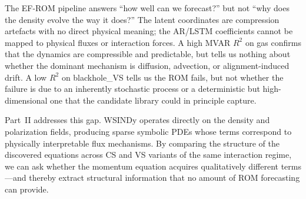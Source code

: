 The EF-ROM pipeline answers ``how well can we forecast?'' but not ``why
does the density evolve the way it does?''  The latent coordinates are
compression artefacts with no direct physical meaning; the AR/LSTM
coefficients cannot be mapped to physical fluxes or interaction forces.
A high MVAR $R^2$ on gas confirms that the dynamics are compressible and
predictable, but tells us nothing about whether the dominant mechanism is
diffusion, advection, or alignment-induced drift.
A low $R^2$ on blackhole\_VS tells us the ROM fails, but not whether the
failure is due to an inherently stochastic process or a deterministic but
high-dimensional one that the candidate library could in principle capture.

Part~II addresses this gap.  WSINDy operates directly on the density and
polarization fields, producing sparse symbolic PDEs whose terms
correspond to physically interpretable flux mechanisms.  By comparing the
structure of the discovered equations across CS and VS variants of the
same interaction regime, we can ask whether the momentum equation
acquires qualitatively different terms---and thereby extract structural
information that no amount of ROM forecasting can provide.
